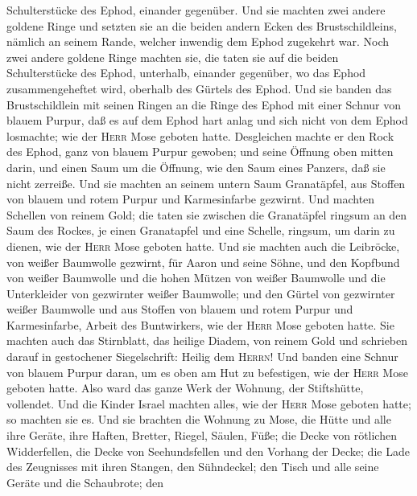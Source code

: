 Schulterstücke des Ephod, einander gegenüber.  Und sie
machten zwei andere goldene Ringe und setzten sie an die beiden andern
Ecken des Brustschildleins, nämlich an seinem Rande, welcher inwendig
dem Ephod zugekehrt war.  Noch zwei andere goldene Ringe
machten sie, die taten sie auf die beiden Schulterstücke des Ephod,
unterhalb, einander gegenüber, wo das Ephod zusammengeheftet wird,
oberhalb des Gürtels des Ephod.  Und sie banden das
Brustschildlein mit seinen Ringen an die Ringe des Ephod mit einer
Schnur von blauem Purpur, daß es auf dem Ephod hart anlag und sich nicht
von dem Ephod losmachte; wie der \textsc{Herr} Mose geboten hatte.
 Desgleichen machte er den Rock des Ephod, ganz von
blauem Purpur gewoben;  und seine Öffnung oben mitten
darin, und einen Saum um die Öffnung, wie den Saum eines Panzers, daß
sie nicht zerreiße.  Und sie machten an seinem untern
Saum Granatäpfel, aus Stoffen von blauem und rotem Purpur und
Karmesinfarbe gezwirnt.  Und machten Schellen von reinem
Gold; die taten sie zwischen die Granatäpfel ringsum an den Saum des
Rockes,  je einen Granatapfel und eine Schelle, ringsum,
um darin zu dienen, wie der \textsc{Herr} Mose geboten hatte.
 Und sie machten auch die Leibröcke, von weißer Baumwolle
gezwirnt, für Aaron und seine Söhne,  und den Kopfbund
von weißer Baumwolle und die hohen Mützen von weißer Baumwolle und die
Unterkleider von gezwirnter weißer Baumwolle;  und den
Gürtel von gezwirnter weißer Baumwolle und aus Stoffen von blauem und
rotem Purpur und Karmesinfarbe, Arbeit des Buntwirkers, wie der
\textsc{Herr} Mose geboten hatte.  Sie machten auch das
Stirnblatt, das heilige Diadem, von reinem Gold und schrieben darauf in
gestochener Siegelschrift: Heilig dem \textsc{Herrn}! 
Und banden eine Schnur von blauem Purpur daran, um es oben am Hut zu
befestigen, wie der \textsc{Herr} Mose geboten hatte. 
Also ward das ganze Werk der Wohnung, der Stiftshütte, vollendet. Und
die Kinder Israel machten alles, wie der \textsc{Herr} Mose geboten
hatte; so machten sie es.  Und sie brachten die Wohnung
zu Mose, die Hütte und alle ihre Geräte, ihre Haften, Bretter, Riegel,
Säulen, Füße;  die Decke von rötlichen Widderfellen, die
Decke von Seehundsfellen und den Vorhang der Decke;  die
Lade des Zeugnisses mit ihren Stangen, den Sühndeckel; 
den Tisch und alle seine Geräte und die Schaubrote;  den
